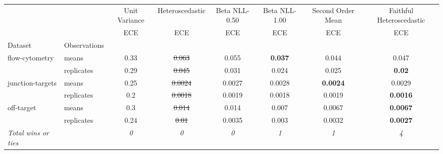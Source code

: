 \begin{tabular}{ll|c|c|c|c|c|c}
\toprule
{} & {} & {Unit Variance} & {Heteroscedastic} & {Beta NLL-0.50} & {Beta NLL-1.00} & {Second Order Mean} & {Faithful Heteroscedastic} \\
{} & {} & {ECE} & {ECE} & {ECE} & {ECE} & {ECE} & {ECE} \\
{Dataset} & {Observations} & {} & {} & {} & {} & {} & {} \\
\midrule
\multirow[t]{2}{*}{flow-cytometry} & means & 0.33 & \sout{0.063} & 0.055 & \textbf{0.037} & 0.044 & 0.047 \\
 & replicates & 0.29 & \sout{0.045} & 0.031 & 0.024 & 0.025 & \textbf{0.02} \\
\multirow[t]{2}{*}{junction-targets} & means & 0.25 & \sout{0.0024} & 0.0027 & 0.0028 & \textbf{0.0024} & 0.0029 \\
 & replicates & 0.2 & \sout{0.0018} & 0.0019 & 0.0018 & 0.0019 & \textbf{0.0016} \\
\multirow[t]{2}{*}{off-target} & means & 0.3 & \sout{0.014} & 0.014 & 0.007 & 0.0067 & \textbf{0.0067} \\
 & replicates & 0.24 & \sout{0.01} & 0.0035 & 0.003 & 0.0032 & \textbf{0.0027} \\
\textit{{Total wins or ties}} &  & \textit{0} & \textit{0} & \textit{0} & \textit{1} & \textit{1} & \textit{4} \\
\bottomrule
\end{tabular}
